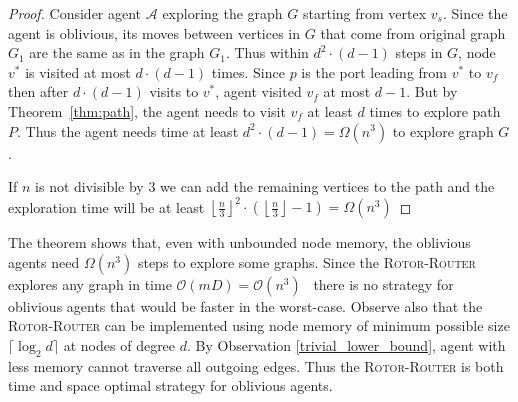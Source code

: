 \documentclass{article}[11pt,letter]
\newcommand{\bigo}{\mathcal{O}}
\newcommand{\agent}{\ensuremath{\mathcal{A}}\xspace}
\newcommand{\RR}{{\textsc{Rotor-Router}}\xspace}
\begin{document}
\begin{proof}
Consider agent $\agent$ exploring the graph $G$ starting from vertex $v_s$. Since the agent is oblivious, its moves between vertices in $G$ that come from original graph $G_1$ are the same as in the graph $G_1$. Thus within $d^2 \cdot (d-1)$ steps in $G$, node $v^*$ is visited at most $d \cdot (d-1)$ times. Since $p$ is the port leading from $v^*$ to $v_f$ then after $d \cdot (d-1)$ visits to $v^*$, agent visited $v_f$ at most $d-1$.
But by Theorem~\ref{thm:path}, the agent needs to visit $v_f$ at least $d$ times to explore path $P$. Thus the agent needs time at least $d^2 \cdot (d-1) = \Omega(n^3)$ to explore graph $G$.

If $n$ is not divisible by $3$ we can add the remaining vertices to the path and the exploration time will be at least $\left\lfloor \frac{n}{3} \right\rfloor^2 \cdot \left(\left\lfloor \frac{n}{3} \right\rfloor-1\right) = \Omega(n^3)$
\end{proof}
The theorem shows that, even with unbounded node memory, the oblivious agents need $\Omega(n^3)$ steps to explore some graphs. Since the \RR explores any graph in time $\bigo(mD) = \bigo(n^3)$~\cite{Yanovski} there is no strategy for oblivious agents that would be faster in the worst-case. Observe also that the \RR can be implemented using node memory of minimum possible size $\lceil \log_2 d \rceil$ at nodes of degree $d$. By Observation \ref{trivial_lower_bound}, agent with less memory cannot traverse all outgoing edges. Thus the \RR is both time and space optimal strategy for oblivious agents.



\end{document}
